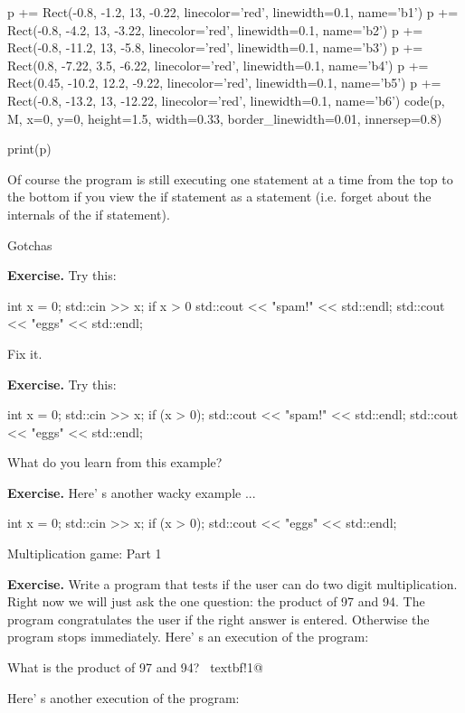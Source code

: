 \begin{python}
p += Rect(-0.8, -1.2, 13, -0.22, linecolor='red', linewidth=0.1, name='b1')
p += Rect(-0.8, -4.2, 13, -3.22, linecolor='red', linewidth=0.1, name='b2')
p += Rect(-0.8, -11.2, 13, -5.8, linecolor='red', linewidth=0.1, name='b3')
p += Rect(0.8, -7.22, 3.5, -6.22, linecolor='red', linewidth=0.1, name='b4')
p += Rect(0.45, -10.2, 12.2, -9.22, linecolor='red', linewidth=0.1, name='b5')
p += Rect(-0.8, -13.2, 13, -12.22, linecolor='red', linewidth=0.1, name='b6')
code(p, M, x=0, y=0, height=1.5, width=0.33, border_linewidth=0.01, innersep=0.8)

print(p)
\end{python}

Of course the program is still executing one statement at a time from
the top to the bottom if you view the if statement as a statement (i.e.
forget about the internals of the if statement).

Gotchas

\textbf{Exercise.} Try this:\\
\begin{console}
int x = 0;
std::cin >> x;
if x > 0
   std::cout << "spam!" << std::endl;
std::cout << "eggs" << std::endl;
\end{console}
Fix it.


\textbf{Exercise.} Try this:\\
\begin{console}
int x = 0;
std::cin >> x;
if (x > 0);
   std::cout << "spam!" << std::endl;
std::cout << "eggs" << std::endl;
\end{console}
What do you learn from this example?

\textbf{Exercise.} Here' s another wacky example ...
\begin{console}
int x = 0;
std::cin >> x;
if (x > 0);
std::cout << "eggs" << std::endl;
\end{console}
Multiplication game: Part 1

\textbf{Exercise.} Write a program that tests if the user can do two digit
multiplication. Right now we will just ask the one question: the product
of 97 and 94. The program congratulates the user if the right answer is
entered. Otherwise the program stops immediately. Here' s
an execution of the program:\\
\begin{console}[commandchars=\~\!\@]
What is the product of 97 and 94? ~textbf!1@
\end{console}
Here' s another execution of the program:\\

